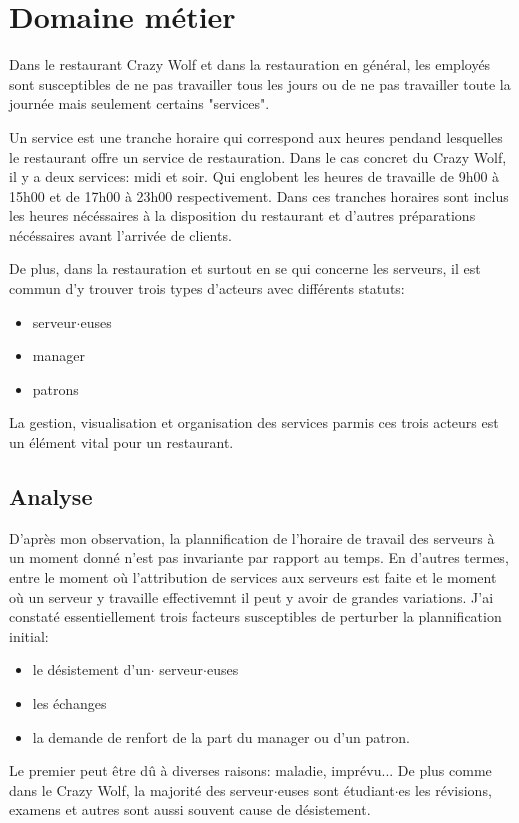 
\chapter[Domaine métier]{Domaine métier}
Dans le restaurant Crazy Wolf et dans la restauration en général, les employés sont susceptibles de ne pas travailler tous les jours ou de ne pas travailler toute la journée mais seulement certains "services".

Un service est une tranche horaire qui correspond aux heures pendand lesquelles le restaurant offre un service de restauration. Dans le cas concret du Crazy Wolf, il y a deux services: midi et soir. Qui englobent les heures de travaille de 9h00 à 15h00 et de 17h00 à 23h00 respectivement. Dans ces tranches horaires sont inclus les heures nécéssaires à la disposition du restaurant et d'autres préparations nécéssaires avant l'arrivée de clients.

De plus, dans la restauration et surtout en se qui concerne les serveurs, il est commun d'y trouver trois types d'acteurs avec différents statuts: 
\smallskip
\begin{itemize}
    \item serveur$\cdot$euses
    \item manager 
    \item patrons
\end{itemize}
\smallskip
La gestion, visualisation et organisation des services parmis ces trois acteurs est un élément vital pour un restaurant.

\section[Analyse]{Analyse}
D'après mon observation, la plannification de l'horaire de travail des serveurs à un moment donné n'est pas invariante par rapport au temps. En d'autres termes, entre le moment où l'attribution de services aux serveurs est faite et le moment où un serveur y travaille effectivemnt il peut y avoir de grandes variations. J'ai constaté essentiellement trois facteurs susceptibles de perturber la plannification initial:
\smallskip
\begin{itemize}
    \item le désistement d'un$\cdot$ serveur$\cdot$euses
    \item les échanges
    \item la demande de renfort de la part du manager ou d'un patron.
\end{itemize}
\smallskip
Le premier peut être dû à diverses raisons: maladie, imprévu... De plus comme dans le Crazy Wolf, la majorité des serveur$\cdot$euses sont étudiant$\cdot$es les révisions, examens et autres sont aussi souvent cause de désistement.

